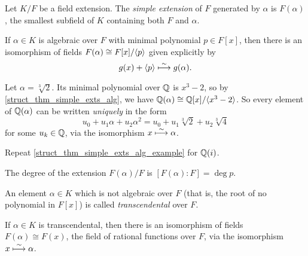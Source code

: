 \begin{definition}
    Let $K/F$ be a field extension. The \emph{simple extension} of $F$ generated by $\alpha$ is $F(\alpha)$, the smallest subfield of $K$ containing both $F$ and $\alpha$.
\end{definition}

\begin{theorem}
\label{struct_thm_simple_exts_alg}
    If $\alpha \in K$ is algebraic over $F$ with minimal polynomial $p \in F[x]$, then there is an isomorphism of fields $F(\alpha) \cong F[x] / \langle {p} \rangle$ given explicitly by
    \[
        g(x) + \langle {p} \rangle \stackrel{\sim}{\longmapsto} g(\alpha).
    \]
\end{theorem}

\begin{example}
\label{struct_thm_simple_exts_alg_example}
    Let $\alpha = \sqrt[3]{2}$. Its minimal polynomial over $\mathbb{{Q}}$ is $x^3 - 2$, so by \cref{struct_thm_simple_exts_alg}, we have $\mathbb{{Q}}(\alpha) \cong \mathbb{{Q}}[x]/\langle {x^3 - 2} \rangle$. So every element of $\mathbb{{Q}}(\alpha)$ can be written \emph{uniquely} in the form
    \[
        u_0 + u_1 \alpha + u_2 \alpha^2 = u_0 + u_1 \sqrt[3]{2} + u_2 \sqrt[3]{4}
    \]
    for some $u_k \in \mathbb{{Q}}$, via the isomorphism $x \stackrel{\sim}{\longmapsto} \alpha$.
\end{example}

\begin{exercise}
    Repeat \cref{struct_thm_simple_exts_alg_example} for $\mathbb{{Q}}(i)$.
\end{exercise}

\begin{corollary}
    The degree of the extension $F(\alpha)/F$ is $[F(\alpha) : F] = \deg{p}$.
\end{corollary}

\begin{definition}
    An element $\alpha \in K$ which is not algebraic over $F$ (that is, the root of no polynomial in $F[x]$) is called \emph{transcendental} over $F$.
\end{definition}

\begin{theorem}
    If $\alpha \in K$ is transcendental, then there is an isomorphism of fields $F(\alpha) \cong F(x)$, the field of rational functions over $F$, via the isomorphism $x \stackrel{\sim}{\longmapsto} \alpha$.
\end{theorem}
